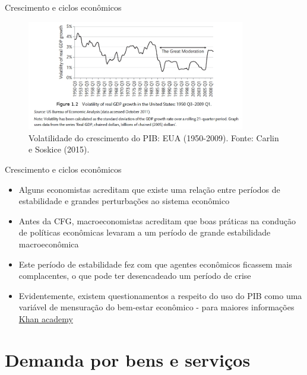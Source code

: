 \documentclass[10pt]{beamer}
\begin{document}
\begin{frame}{Crescimento e ciclos econômicos}
    \begin{figure}
        \centering
        \includegraphics[width=0.85\textwidth]{./figures/aula5_fig5.PNG}
        \caption{Volatilidade do crescimento do PIB: EUA (1950-2009). Fonte: Carlin e Soskice (2015).}
        \label{aula5_fig5}
    \end{figure}
\end{frame}

\begin{frame}{Crescimento e ciclos econômicos}
    \begin{itemize}
        \item Alguns economistas acreditam que existe uma relação entre períodos de estabilidade e grandes perturbações ao sistema econômico\bigskip
         
        \item Antes da CFG, macroeconomistas acreditam que boas práticas na condução de políticas econômicas levaram a um período de grande estabilidade macroeconômica\bigskip
         
        \item Este período de estabilidade fez com que agentes econômicos ficassem mais complacentes, o que pode ter desencadeado um período de crise\bigskip
         
        \item Evidentemente, existem questionamentos a respeito do uso do PIB como uma variável de mensuração do bem-estar econômico - para maiores informações \href{https://www.khanacademy.org/economics-finance-domain/macroeconomics/macro-economic-indicators-and-the-business-cycle/macro-limitations-of-gdp/a/how-well-gdp-measures-the-well-being-of-society-cnx}{Khan academy}
    \end{itemize}
\end{frame}

\section{Demanda por bens e serviços}
\end{document}
